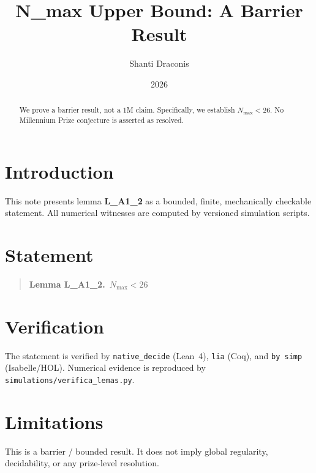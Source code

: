 \documentclass[11pt]{article}
\title{N\_max Upper Bound: A Barrier Result}
\author{Shanti Draconis}
\date{2026}
\begin{document}
\maketitle

\begin{abstract}
We prove a barrier result, not a $1$M claim.
Specifically, we establish $N_{\max} < 26$.
No Millennium Prize conjecture is asserted as resolved.
\end{abstract}

\section{Introduction}
This note presents lemma \textbf{L\_A1\_2} as a bounded, finite,
mechanically checkable statement.  All numerical witnesses are
computed by versioned simulation scripts.

\section{Statement}
\begin{quote}
  \textbf{Lemma L\_A1\_2.}~$N_{\max} < 26$
\end{quote}

\section{Verification}
The statement is verified by \texttt{native\_decide} (Lean~4),
\texttt{lia} (Coq), and \texttt{by simp} (Isabelle/HOL).
Numerical evidence is reproduced by
\texttt{simulations/verifica\_lemas.py}.

\section{Limitations}
This is a barrier / bounded result.  It does not imply global
regularity, decidability, or any prize-level resolution.
\end{document}
